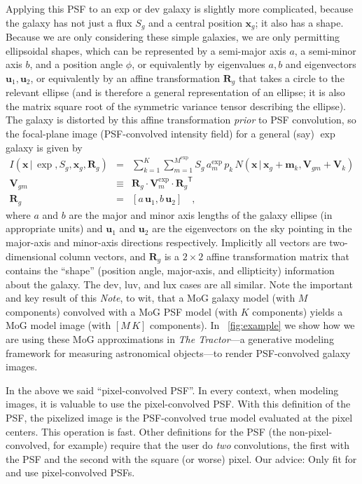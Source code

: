 \documentclass[12pt,pdftex,preprint]{aastex}
\newcommand{\documentname}{\textsl{Note}}
\newcommand{\project}[1]{\textsl{#1}}
\newcommand{\tmatrix}[1]{\boldsymbol{#1}}
\newcommand{\transpose}[1]{{#1}^{\mathsf T}}
\newcommand{\tvector}[1]{\boldsymbol{#1}}
\newcommand{\pos}{\tvector{x}}
\newcommand{\mean}{\tvector{m}}
\newcommand{\var}{\tmatrix{V}}
\newcommand{\affine}{\tmatrix{R}}
\newcommand{\uv}{\tvector{u}}
\newcommand{\normal}{N}
\newcommand{\given}{\,|\,}
\newcommand{\dev}{\mathrm{dev}}
\newcommand{\lux}{\mathrm{lux}}
\newcommand{\luv}{\mathrm{luv}}
\begin{document}
Applying this PSF to an exp or dev galaxy is slightly more
complicated, because the galaxy has not just a flux $S_g$ and a
central position $\pos_g$; it also has a shape.  Because we are only
considering these simple galaxies, we are only permitting ellipsoidal
shapes, which can be represented by a semi-major axis $a$, a
semi-minor axis $b$, and a position angle $\phi$, or equivalently by
eigenvalues $a, b$ and eigenvectors $\uv_1, \uv_2$, or equivalently by
an affine transformation $\affine_g$ that takes a circle to the
relevant ellipse (and is therefore a general representation of an
ellipse; it is also the matrix square root of the symmetric variance
tensor describing the ellipse).  The galaxy is distorted by this
affine transformation \emph{prior} to PSF convolution, so the
focal-plane image (PSF-convolved intensity field) for a general (say)
$\exp$ galaxy is given by
\begin{eqnarray}\displaystyle
I(\pos\given\exp,S_g,\pos_g,\affine_g) &=& \sum_{k=1}^K \sum_{m=1}^{M^{\exp}} S_g\,a^{\exp}_m\,p_k\,\normal(\pos\given\pos_g+\mean_k,\var_{gm}+\var_k)
\\
\var_{gm} &\equiv& \affine_g\cdot\var^{\exp}_m\cdot\transpose{\affine_g}
\\
\affine_g &=& \left[a\,\uv_1 , b\,\uv_2 \right]
\quad ,
\end{eqnarray}
where $a$ and $b$ are the major and minor axis lengths of the galaxy
ellipse (in appropriate units) and $\uv_1$ and $\uv_2$ are the
eigenvectors on the sky pointing in the major-axis and minor-axis
directions respectively.  Implicitly all vectors are two-dimensional
column vectors, and $\affine_g$ is a $2\times 2$ affine transformation
matrix that contains the ``shape'' (position angle, major-axis, and
ellipticity) information about the galaxy.  The $\dev$, $\luv$, and
$\lux$ cases are all similar.  Note the important and key result of
this \documentname, to wit, that a MoG galaxy model (with $M$
components) convolved with a MoG PSF model (with $K$ components)
yields a MoG model image (with $[M\,K]$ components).  In
\figurename~\ref{fig:example} we show how we are using these MoG
approximations in \project{The Tractor}---a generative modeling
framework for measuring astronomical objects---to render PSF-convolved
galaxy images.

In the above we said ``pixel-convolved PSF''.  In every context, when
modeling images, it is valuable to use the pixel-convolved PSF.  With
this definition of the PSF, the pixelized image is the PSF-convolved
true model evaluated at the pixel centers.  This operation is fast.
Other definitions for the PSF (the non-pixel-convolved, for example)
require that the user do \emph{two} convolutions, the first with the
PSF and the second with the square (or worse) pixel.  Our advice: Only
fit for and use pixel-convolved PSFs.
\end{document}
